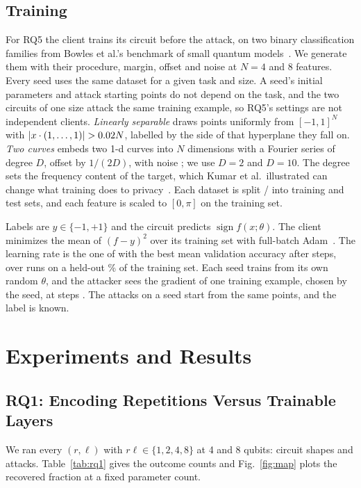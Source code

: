 \documentclass[10pt,conference]{IEEEtran}
\begin{document}
\subsection{Training}\label{sec:rq5-training}
For RQ5 the client trains its circuit before the attack, on two binary classification families
from Bowles et al.'s benchmark of small quantum models~\cite{bowles2024}. We generate them with
their procedure, margin, offset and noise at $N = 4$ and 8 features. Every seed uses the same dataset for a given task and size. A seed's initial parameters and
attack starting points do not depend on the task, and the two circuits of one size attack the
same training example, so RQ5's settings are not independent clients. \emph{Linearly separable} draws \BenchSamples{}
points uniformly from $[-1,1]^N$ with $|x\cdot(1,\dots,1)| > 0.02 N$, labelled by the
side of that hyperplane they fall on. \emph{Two curves} embeds two 1-d curves into $N$ dimensions with a Fourier series
of degree $D$, offset by $1/(2D)$, with noise \BenchNoise; we use $D = 2$ and $D = 10$. The degree
sets the frequency content of the target, which Kumar et al.\ illustrated can change what training
does to privacy~\cite{kumar2023}. Each dataset is split \TrainPercent/\TestPercent{} into training and
test sets, and each feature is scaled to $[0,\pi]$ on the training set.

Labels are $y\in\{-1,+1\}$ and the circuit predicts $\operatorname{sign} f(x;\theta)$. The client
minimizes the mean of $(f - y)^2$ over its training set with full-batch
Adam~\cite{kingma2015}. The learning rate is the one of \LearningRates{} with the best mean
validation accuracy after \TrainSteps{} steps, over \TuningSeeds{} runs on a held-out
\ValidationPercent\% of the training set. Each seed trains from its own random $\theta$, and the
attacker sees the gradient of one training example, chosen by the seed, at steps \TrainedSteps.
The attacks on a seed start from the same points, and the label is known.

\section{Experiments and Results}
\subsection{RQ1: Encoding Repetitions Versus Trainable Layers}\label{sec:rq1}
We ran every $(r,\ell)$ with $r\ell\in\{1,2,4,8\}$ at 4 and 8 qubits: \RqOneShapes{} circuit
shapes and \RqOneAttacks{} attacks. Table~\ref{tab:rq1} gives the outcome counts and
Fig.~\ref{fig:map} plots the recovered fraction at a fixed parameter count.
\end{document}
